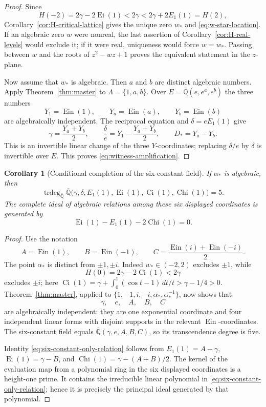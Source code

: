 \documentclass[11pt]{article}
\newtheorem{corollary}[theorem]{Corollary}
\theoremstyle{definition}
\theoremstyle{remark}
\newcommand{\Qbar}{\overline{\mathbb Q}}
\newcommand{\Ein}{\operatorname{Ein}}
\newcommand{\Ei}{\operatorname{Ei}}
\newcommand{\Ci}{\operatorname{Ci}}
\newcommand{\Chi}{\operatorname{Chi}}
\begin{document}
\begin{proof}
Since
\[
 H(-2)=2\gamma-2\Ei(1)<2\gamma
 <2\gamma+2E_1(1)=H(2),
\]
Corollary~\ref{cor:H-critical-lattice} gives the unique zero $w_*$ and
\eqref{eq:w-star-location}.  If an algebraic zero $w$ were nonreal, the
last assertion of Corollary~\ref{cor:H-real-levels} would exclude it; if it
were real, uniqueness would force $w=w_*$.  Passing between $w$ and the
roots of $z^2-wz+1$ proves the equivalent statement in the $z$-plane.

Now assume that $w_*$ is algebraic.  Then $a$ and $b$ are distinct
algebraic numbers.  Apply Theorem~\ref{thm:master} to
$\Lambda=\{1,a,b\}$.  Over
$E=\Qbar(e,e^a,e^b)$ the three numbers
\[
 Y_1=\Ein(1),\qquad Y_a=\Ein(a),\qquad Y_b=\Ein(b)
\]
are algebraically independent.  The reciprocal equation and
$\delta=eE_1(1)$ give
\[
 \gamma=\frac{Y_a+Y_b}{2},\qquad
 \frac{\delta}{e}=Y_1-\frac{Y_a+Y_b}{2},\qquad
 D_*=Y_a-Y_b.
\]
This is an invertible linear change of the three $Y$-coordinates; replacing
$\delta/e$ by $\delta$ is invertible over $E$.  This proves
\eqref{eq:witness-amplification}.
\end{proof}

\begin{corollary}[Conditional completion of the six-constant field]
\label{cor:witness-six-constant-field}
If $\alpha_*$ is algebraic, then
\[
 \operatorname{trdeg}_{\Qbar}
 \Qbar\bigl(\gamma,\delta,E_1(1),\Ei(1),\Ci(1),\Chi(1)\bigr)=5.
\]
The complete ideal of algebraic relations among these six displayed
coordinates is generated by
\begin{equation}\label{eq:six-constant-only-relation}
 \Ei(1)-E_1(1)-2\Chi(1)=0.
\end{equation}
\end{corollary}

\begin{proof}
Use the notation
\[
 A=\Ein(1),\qquad B=\Ein(-1),\qquad
 C=\frac{\Ein(i)+\Ein(-i)}2.
\]
The point $\alpha_*$ is distinct from $\pm1,\pm i$.  Indeed
$w_*\in(-2,2)$ excludes $\pm1$, while
\[
 H(0)=2\gamma-2\Ci(1)<2\gamma
\]
excludes $\pm i$; here
$\Ci(1)=\gamma+\int_0^1(\cos t-1)\,dt/t>\gamma-1/4>0$.
Theorem~\ref{thm:master}, applied to
$\{1,-1,i,-i,\alpha_*,\alpha_*^{-1}\}$, now shows that
\[
 \gamma,\quad e,\quad A,\quad B,\quad C
\]
are algebraically independent: they are one exponential coordinate and
four independent linear forms with disjoint supports in the relevant
$\Ein$-coordinates.  The six-constant field equals
$\Qbar(\gamma,e,A,B,C)$, so its transcendence degree is five.

Identity \eqref{eq:six-constant-only-relation} follows from
$E_1(1)=A-\gamma$, $\Ei(1)=\gamma-B$, and
$\Chi(1)=\gamma-(A+B)/2$.  The kernel of the evaluation map from a
polynomial ring in the six displayed coordinates is a height-one prime.
It contains the irreducible linear polynomial in
\eqref{eq:six-constant-only-relation}; hence it is precisely the principal
ideal generated by that polynomial.
\end{proof}
\end{document}
